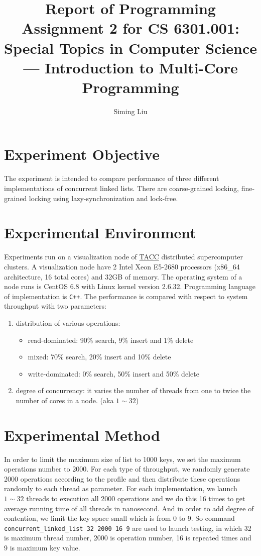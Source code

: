 \documentclass[a4paper]{report}
\begin{document}
\title{Report of Programming Assignment 2 for CS 6301.001: Special Topics in Computer Science --- Introduction to Multi-Core Programming}

\author{Siming Liu}

\maketitle{}

\section*{Experiment Objective}
The experiment is intended to compare performance of three different implementations of concurrent linked lists. There are coarse-grained locking, fine-grained locking using lazy-synchronization and lock-free.

\section*{Experimental Environment}
Experiments run on a visualization node of \href{https://www.tacc.utexas.edu/}{TACC} distributed supercomputer clusters.
A visualization node have 2 Intel Xeon E5-2680 processors (x86\_64 architecture, 16 total cores) and 32GB of memory.
The operating system of a node runs is CentOS 6.8 with Linux kernel version 2.6.32.
Programming language of implementation is \lstinline{C++}.
The performance is compared with respect to system throughput with two parameters:
\begin{enumerate}
  \item distribution of various operations:
  \begin{itemize}
    \item read-dominated: 90\% search, 9\% insert and 1\% delete
    \item mixed: 70\% search, 20\% insert and 10\% delete
    \item write-dominated: 0\% search, 50\% insert and 50\% delete
  \end{itemize}
  \item degree of concurrency: it varies the number of threads from one to twice the number of cores in a node. (aka $1 \sim 32$)
\end{enumerate}

\section*{Experimental Method}
In order to limit the maximum size of list to 1000 keys, we set the maximum operations number to 2000.
For each type of throughput, we randomly generate 2000 operations according to the profile and then distribute these operations randomly to each thread as parameter. For each implementation, we launch $1 \sim 32$ threads to execution all 2000 operations and we do this 16 times to get average running time of all threads in nanosecond. And in order to add degree of contention, we limit the key space small which is from 0 to 9. So command \lstinline{concurrent_linked_list 32 2000 16 9} are used to launch testing, in which 32 is maximum thread number, 2000 is operation number, 16 is repeated times and 9 is maximum key value.
\end{document}
